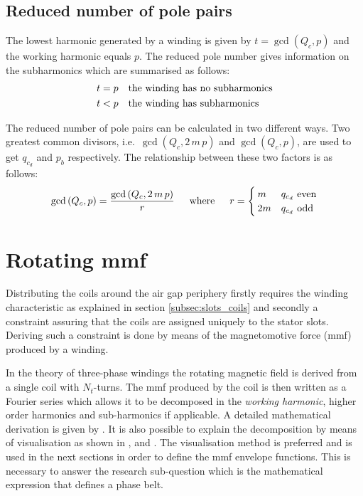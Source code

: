 \subsection{Reduced number of pole pairs}
The lowest harmonic generated by a winding is given by $t=\gcd\left(Q_c,p\right)$ and the working harmonic equals $p$. The reduced pole number gives information on the subharmonics which are summarised as follows:
\begin{equation}	
 \begin{aligned}
	t &= p \quad \textnormal{the winding has no subharmonics} \\
	t &< p \quad \textnormal{the winding has subharmonics}
	\end{aligned}
\end{equation} 

The reduced number of pole pairs can be calculated in two different ways. Two greatest common divisors, i.e.~$\gcd\left(Q_c,2\,m\,p\right)$ and $\gcd\left(Q_c,p\right)$, are used to get $q_{c_d}$ and $p_b$ respectively. The relationship between these two factors is as follows:
\begin{equation}
  \label{eqn:reduced_p} 
  \gcd\left(Q_c,p\right)=\frac{\gcd\left(Q_c,2\,m\,p\right)}{r} \hspace{15pt}
  \textnormal{where} \hspace{15pt} r=
  \begin{cases}
	 m  & \text{$q_{c_d}$ even}\\
	 2m & \text{$q_{c_d}$ odd}
  \end{cases}
\end{equation}

\section{Rotating mmf}
Distributing the coils around the air gap periphery firstly requires the winding characteristic as explained in section \ref{subsec:slots_coils} and secondly a constraint assuring that the coils are assigned uniquely to the stator slots. Deriving such a constraint is done by means of the magnetomotive force (mmf) produced by a winding. 

In the theory of three-phase windings the rotating magnetic field is derived from a single coil with $N_t$-turns. The mmf produced by the coil is then written as a Fourier series which allows it to be decomposed in the \textit{working harmonic}, higher order harmonics and sub-harmonics if applicable. A detailed mathematical derivation is given by \cite{helle_1977}. It is also possible to explain the decomposition by means of visualisation as shown in \cite{Nuernerg1952}, \cite{Jordan1975} and  \cite{Fitzgerald1992}. The visualisation method is preferred and is used in the next sections in order to define the mmf envelope functions. This is necessary to answer the research sub-question which is the mathematical expression that defines a phase belt.

